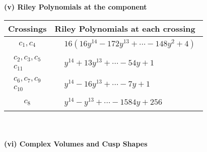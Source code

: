 \documentclass[1p]{elsarticle_modified}
\theoremstyle{definition}
\begin{document}
\newpage\renewcommand{\arraystretch}{1}
\flushleft \textbf{(v) Riley Polynomials at the component}\newline \\
\begin{tabular}{m{50pt}|m{274pt}}
Crossings & \hspace{64pt}Riley Polynomials at each crossing \\
\hline $$\begin{aligned}c_{1},c_{4}\end{aligned}$$&$\begin{aligned}
&16(16 y^{14}-172 y^{13}+\cdots-148 y^2+4)
\end{aligned}$\\
\hline $$\begin{aligned}c_{2},c_{3},c_{5}\\c_{11}\end{aligned}$$&$\begin{aligned}
&y^{14}+13 y^{13}+\cdots-54 y+1
\end{aligned}$\\
\hline $$\begin{aligned}c_{6},c_{7},c_{9}\\c_{10}\end{aligned}$$&$\begin{aligned}
&y^{14}-16 y^{13}+\cdots-7 y+1
\end{aligned}$\\
\hline $$\begin{aligned}c_{8}\end{aligned}$$&$\begin{aligned}
&y^{14}- y^{13}+\cdots-1584 y+256
\end{aligned}$\\
\hline
\end{tabular}\\~\\
\newpage\flushleft \textbf{(vi) Complex Volumes and Cusp Shapes}
\end{document}
